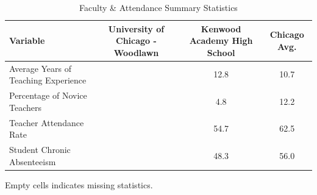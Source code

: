 \begin{table}[H]
\renewcommand{\arraystretch}{1.5}
\caption*{
{\large Faculty \& Attendance Summary Statistics}
} 

\fontsize{10pt}{11pt}\selectfont

\begin{tabular*}{\linewidth}{@{\extracolsep{\fill}}lccc}
\toprule
Variable & University of Chicago - Woodlawn & Kenwood Academy High School & Chicago Avg. \\ 
\midrule\addlinespace[2.5pt]
Average Years of Teaching Experience &  & 12.8 & 10.7 \\
Percentage of Novice Teachers &  & 4.8 & 12.2 \\
Teacher Attendance Rate &  & 54.7 & 62.5 \\
Student Chronic Absenteeism &  & 48.3 & 56.0 \\
\bottomrule
\end{tabular*}
\begin{minipage}{\linewidth}
Empty cells indicates missing statistics.\\
\end{minipage}
\end{table}

